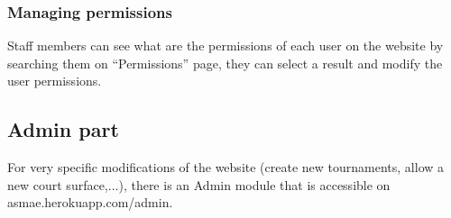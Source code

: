 \subsubsection{Managing permissions}

Staff members can see what are the permissions of each user on the website by searching them on \enquote{Permissions} page, they can select a result and modify the user permissions.

\subsection{Admin part}

For very specific modifications of the website (create new tournaments, allow a new court surface,...), there is an Admin module that is accessible on asmae.herokuapp.com/admin.
